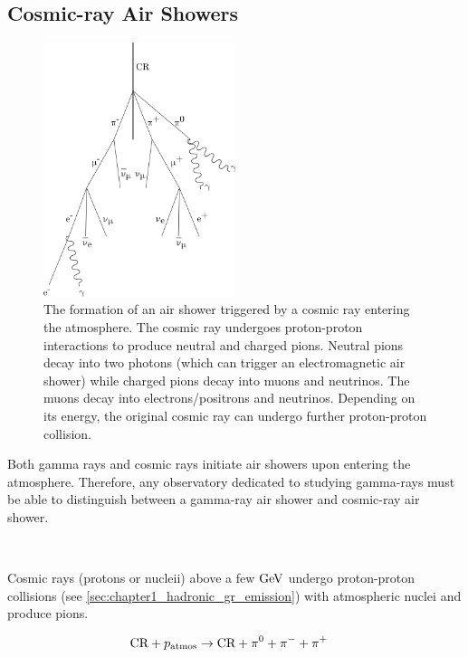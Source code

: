 \subsection{Cosmic-ray Air Showers}
\begin{figure}
    \includegraphics[width=0.5\textwidth]{05_Astronomy/Images/air_shower/cosmic_ray.png}
    \caption{The formation of an air shower triggered by a cosmic ray entering the atmosphere. The cosmic ray undergoes proton-proton interactions to produce neutral and charged pions. Neutral pions decay into two photons (which can trigger an electromagnetic air shower) while charged pions decay into muons and neutrinos. The muons decay into electrons/positrons and neutrinos. Depending on its energy, the original cosmic ray can undergo further proton-proton collision.}
    \label{fig:chapter_2_air_shower_hadron}
\end{figure}
Both gamma rays and cosmic rays initiate air showers upon entering the atmosphere. Therefore, any observatory dedicated to studying gamma-rays must be able to distinguish between a gamma-ray air shower and cosmic-ray air shower.
\par~\par
Cosmic rays (protons or nucleii) above a few $\si{\giga\electronvolt}$ undergo proton-proton collisions (see \autoref{sec:chapter1_hadronic_gr_emission}) with atmospheric nuclei and produce pions.

\begin{equation}
    \begin{aligned}
    \text{CR} + p_\text{atmos} &\rightarrow \text{CR} + \pionneutral + \pionminus + \pionplus
    \end{aligned}
\end{equation}

